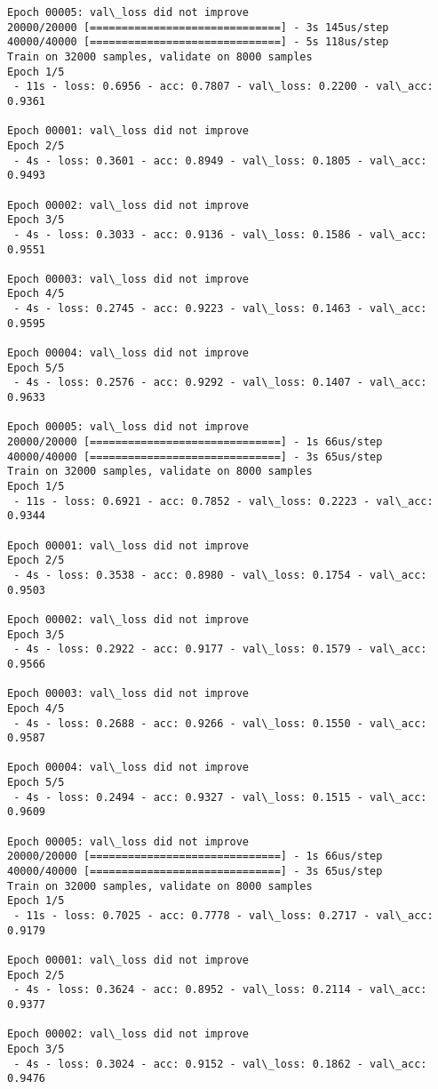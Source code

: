 \documentclass[11pt]{article}
\begin{document}
\begin{Verbatim}[commandchars=\\\{\}]
Epoch 00005: val\_loss did not improve
20000/20000 [==============================] - 3s 145us/step
40000/40000 [==============================] - 5s 118us/step
Train on 32000 samples, validate on 8000 samples
Epoch 1/5
 - 11s - loss: 0.6956 - acc: 0.7807 - val\_loss: 0.2200 - val\_acc: 0.9361

Epoch 00001: val\_loss did not improve
Epoch 2/5
 - 4s - loss: 0.3601 - acc: 0.8949 - val\_loss: 0.1805 - val\_acc: 0.9493

Epoch 00002: val\_loss did not improve
Epoch 3/5
 - 4s - loss: 0.3033 - acc: 0.9136 - val\_loss: 0.1586 - val\_acc: 0.9551

Epoch 00003: val\_loss did not improve
Epoch 4/5
 - 4s - loss: 0.2745 - acc: 0.9223 - val\_loss: 0.1463 - val\_acc: 0.9595

Epoch 00004: val\_loss did not improve
Epoch 5/5
 - 4s - loss: 0.2576 - acc: 0.9292 - val\_loss: 0.1407 - val\_acc: 0.9633

Epoch 00005: val\_loss did not improve
20000/20000 [==============================] - 1s 66us/step
40000/40000 [==============================] - 3s 65us/step
Train on 32000 samples, validate on 8000 samples
Epoch 1/5
 - 11s - loss: 0.6921 - acc: 0.7852 - val\_loss: 0.2223 - val\_acc: 0.9344

Epoch 00001: val\_loss did not improve
Epoch 2/5
 - 4s - loss: 0.3538 - acc: 0.8980 - val\_loss: 0.1754 - val\_acc: 0.9503

Epoch 00002: val\_loss did not improve
Epoch 3/5
 - 4s - loss: 0.2922 - acc: 0.9177 - val\_loss: 0.1579 - val\_acc: 0.9566

Epoch 00003: val\_loss did not improve
Epoch 4/5
 - 4s - loss: 0.2688 - acc: 0.9266 - val\_loss: 0.1550 - val\_acc: 0.9587

Epoch 00004: val\_loss did not improve
Epoch 5/5
 - 4s - loss: 0.2494 - acc: 0.9327 - val\_loss: 0.1515 - val\_acc: 0.9609

Epoch 00005: val\_loss did not improve
20000/20000 [==============================] - 1s 66us/step
40000/40000 [==============================] - 3s 65us/step
Train on 32000 samples, validate on 8000 samples
Epoch 1/5
 - 11s - loss: 0.7025 - acc: 0.7778 - val\_loss: 0.2717 - val\_acc: 0.9179

Epoch 00001: val\_loss did not improve
Epoch 2/5
 - 4s - loss: 0.3624 - acc: 0.8952 - val\_loss: 0.2114 - val\_acc: 0.9377

Epoch 00002: val\_loss did not improve
Epoch 3/5
 - 4s - loss: 0.3024 - acc: 0.9152 - val\_loss: 0.1862 - val\_acc: 0.9476


\end{Verbatim}
\end{document}

